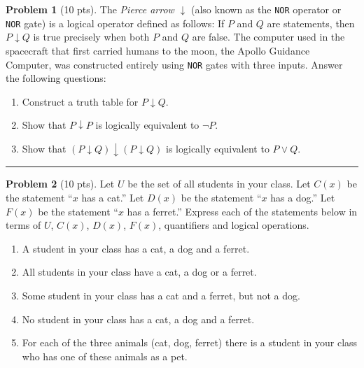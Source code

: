 \documentclass[11pt]{article}
\theoremstyle{definition}
\newtheorem{problem}{Problem}
\begin{document}
\begin{problem}[10 pts]
  The \emph{Pierce arrow} $\downarrow$ (also known as the \texttt{NOR} operator or \texttt{NOR} gate) is a logical
  operator defined as follows: If $P$ and $Q$ are statements, then $P \downarrow Q$ is true precisely when both $P$ and
  $Q$ are false.  The computer used in the spacecraft that first carried humans to the moon, the Apollo Guidance
  Computer, was constructed entirely using \texttt{NOR} gates with three inputs.  Answer the following questions:
  \begin{enumerate}
  \item Construct a truth table for $P\downarrow Q$.
    \vspace{2.5cm}
  \item Show that $P \downarrow P$ is logically equivalent to $\lnot P$.
    \vspace{2.5cm}
  \item Show that $(P \downarrow Q) \downarrow (P \downarrow Q)$ is logically equivalent to $P \lor Q$.
    \vspace{2.5cm}
  \end{enumerate}
\end{problem}
\hrule

\begin{problem}[10 pts]
  Let $U$ be the set of all students in your class.  Let $C(x)$ be the statement ``$x$ has a cat.'' Let $D(x)$ be the
  statement ``$x$ has a dog.'' Let $F(x)$ be the statement ``$x$ has a ferret.''  Express each of the statements below
  in terms of $U$, $C(x)$, $D(x)$, $F(x)$, quantifiers and logical operations.
  \begin{enumerate}
  \item A student in your class has a cat, a dog and a ferret.
    \vspace{1cm}
  \item All students in your class have a cat, a dog or a ferret.
    \vspace{1cm}
  \item Some student in your class has a cat and a ferret, but not a dog.
    \vspace{1cm}
  \item No student in your class has a cat, a dog and a ferret.
    \vspace{1cm}
  \item For each of the three animals (cat, dog, ferret) there is a student in your class who has one of these animals
    as a pet.
  \end{enumerate}
\end{problem}
\newpage
\end{document}
